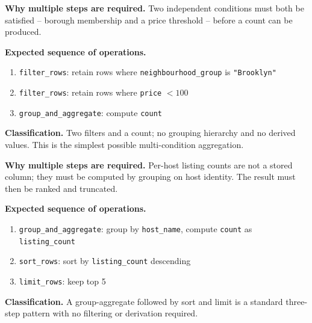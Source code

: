 

\textbf{Why multiple steps are required.}
Two independent conditions must both be satisfied -- borough membership and a price
threshold -- before a count can be produced.

\textbf{Expected sequence of operations.}
\begin{enumerate}
  \item \texttt{filter\_rows}: retain rows where \texttt{neighbourhood\_group}
    is \texttt{"Brooklyn"}
  \item \texttt{filter\_rows}: retain rows where \texttt{price} $< 100$
  \item \texttt{group\_and\_aggregate}: compute \texttt{count}
\end{enumerate}

\textbf{Classification.}
Two filters and a count; no grouping hierarchy and no derived values. This is the
simplest possible multi-condition aggregation.



\textbf{Why multiple steps are required.}
Per-host listing counts are not a stored column; they must be computed by grouping
on host identity. The result must then be ranked and truncated.

\textbf{Expected sequence of operations.}
\begin{enumerate}
  \item \texttt{group\_and\_aggregate}: group by \texttt{host\_name}, compute
    \texttt{count} as \texttt{listing\_count}
  \item \texttt{sort\_rows}: sort by \texttt{listing\_count} descending
  \item \texttt{limit\_rows}: keep top 5
\end{enumerate}

\textbf{Classification.}
A group-aggregate followed by sort and limit is a standard three-step pattern
with no filtering or derivation required.



